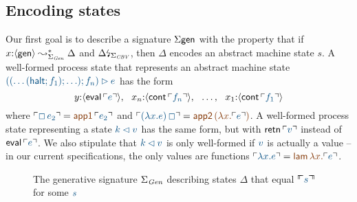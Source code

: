 \subsection{Encoding states}



Our first goal is to describe a signature $\Sigma\sf gen$ with the
property that if $x{:}\langle {\sf gen} \rangle \leadsto^*_{\Sigma_{\it Gen}}
\Delta$ and ${\Delta}{\mbox{\lightning}}_{\Sigma_{\it CBV}}$, then $\Delta$ encodes
an abstract machine state
$s$. A well-formed process state that represents an abstract machine
state $\obj{((\ldots({\sf halt}; f_1); \ldots); f_n) \rhd e}$ has the form
\[
y{:}\susp{{\sf eval}\,\interp{e}}, ~~
x_n{:}\susp{{\sf cont}\,\interp{f_n}}, ~~
\ldots, ~~
x_1{:}\susp{{\sf cont}\,\interp{f_1}}
\]
where $\interp{\Box\,e_2} = \lf{{\sf app1}\,\interp{e_2}}$ and
$\interp{(\lambda x.e)\,\Box} = \lf{{\sf app2}\,(\lambda x.\interp{e})}$. 
A well-formed process state representing a state $\obj{k \lhd v}$ has 
the same form, but with ${\sf retn}\,\interp{v}$ instead
of ${\sf eval}\,\interp{e}$. We also stipulate that 
$\obj{k \lhd v}$ is only well-formed if $\obj{v}$ is actually a value
-- in our current specifications, the only values are functions
$\interp{\lambda x.e} = \lf{{\sf lam}\,\lambda x. \interp{e}}$.

\begin{figure}
\caption{The generative signature $\Sigma_{\it Gen}$ 
 describing states $\Delta$ that equal $\ctxinterp{s}$ for some $\obj{s}$}
\label{fig:cbv-ev-ssos-gen}
\end{figure}

